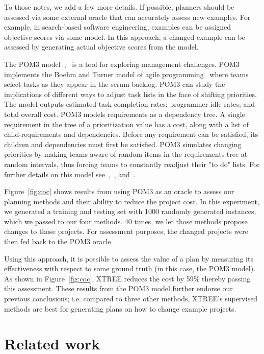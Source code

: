 \documentclass{sig-alternate}
\newcommand{\fig}[1]{Figure~\ref{fig:#1}}
\begin{document}
To those notes, we add a few more details. If possible, planners should be assessed via some external oracle that can accurately assess new examples. For example, in search-based software engineering,
examples can be assigned objective scores via  some model. In this approach, a changed example can be assessed by
generating actual objective scores from the model. 



The POM3 model~\cite{boehm2003using},~\cite{port2008} is a tool for exploring management challenges. POM3 implements the Boehm and Turner model of agile programming~\cite{boehm2003balancing} where teams select tasks as they appear in the scrum backlog.  POM3 can study the implications of different ways to adjust task lists in the face of shifting priorities. The model outputs estimated task completion rates; programmer idle rates; and total overall cost. POM3 models requirements as a dependency tree. A single requirement in the tree of a prioritization value has a cost, along with a list of child-requirements and dependencies. Before any requirement can be satisfied, its children and dependencies must first be satisfied. POM3 simulates changing priorities by making teams aware of random items in the requirements tree at random intervals, thus forcing teams to constantly readjust their "to do" lists. For further details on this model see~\cite{boehm2003using},~\cite{port2008}, and~\cite{boehm2003balancing}. 

\fig{coc} shows results from using POM3 as an oracle to assess our planning methods and their ability to reduce the project cost. In this experiment, we generated a training and testing set with 1000 randomly generated instances, which we passed to our four methods.
40 times, we let those methods propose changes to those projects. 
For assessment purposes, the changed projects were then fed back to the POM3
oracle. 

Using this approach, it is possible to assess the value of a plan by measuring its
effectiveness with respect to some ground truth (in this case, the POM3 model).
As shown in \fig{coc}, XTREE reduces the cost by 59\% thereby passing this assessment. These results from the POM3 model further endorse our previous conclusions; i.e. compared to three other methods,  XTREE's supervised methods are best for generating plans on how to change example projects.
 
 
\section{Related work}
\end{document}
